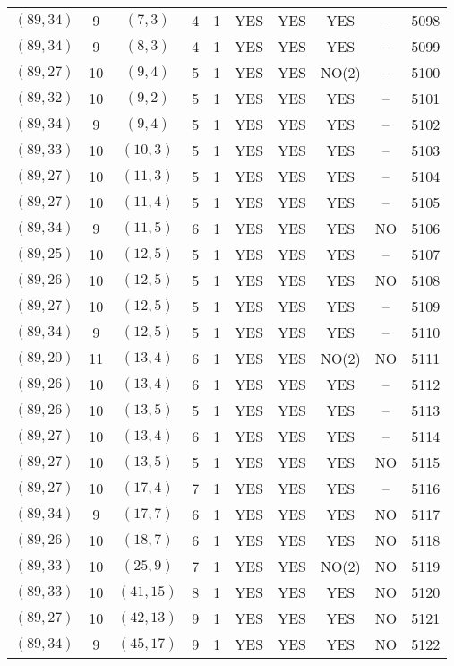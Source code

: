 \begin{longtable}{|c|c|c|c|c|c|c|c|c|c|}
$(89, 34)$ & 9 & $(7, 3)$ & 4 & 1 & YES & YES & YES & -- & 5098\\
$(89, 34)$ & 9 & $(8, 3)$ & 4 & 1 & YES & YES & YES & -- & 5099\\
$(89, 27)$ & 10 & $(9, 4)$ & 5 & 1 & YES & YES & NO(2) & -- & 5100\\
$(89, 32)$ & 10 & $(9, 2)$ & 5 & 1 & YES & YES & YES & -- & 5101\\
$(89, 34)$ & 9 & $(9, 4)$ & 5 & 1 & YES & YES & YES & -- & 5102\\
$(89, 33)$ & 10 & $(10, 3)$ & 5 & 1 & YES & YES & YES & -- & 5103\\
$(89, 27)$ & 10 & $(11, 3)$ & 5 & 1 & YES & YES & YES & -- & 5104\\
$(89, 27)$ & 10 & $(11, 4)$ & 5 & 1 & YES & YES & YES & -- & 5105\\
$(89, 34)$ & 9 & $(11, 5)$ & 6 & 1 & YES & YES & YES & NO & 5106\\
$(89, 25)$ & 10 & $(12, 5)$ & 5 & 1 & YES & YES & YES & -- & 5107\\
$(89, 26)$ & 10 & $(12, 5)$ & 5 & 1 & YES & YES & YES & NO & 5108\\
$(89, 27)$ & 10 & $(12, 5)$ & 5 & 1 & YES & YES & YES & -- & 5109\\
$(89, 34)$ & 9 & $(12, 5)$ & 5 & 1 & YES & YES & YES & -- & 5110\\
$(89, 20)$ & 11 & $(13, 4)$ & 6 & 1 & YES & YES & NO(2) & NO & 5111\\
$(89, 26)$ & 10 & $(13, 4)$ & 6 & 1 & YES & YES & YES & -- & 5112\\
$(89, 26)$ & 10 & $(13, 5)$ & 5 & 1 & YES & YES & YES & -- & 5113\\
$(89, 27)$ & 10 & $(13, 4)$ & 6 & 1 & YES & YES & YES & -- & 5114\\
$(89, 27)$ & 10 & $(13, 5)$ & 5 & 1 & YES & YES & YES & NO & 5115\\
$(89, 27)$ & 10 & $(17, 4)$ & 7 & 1 & YES & YES & YES & -- & 5116\\
$(89, 34)$ & 9 & $(17, 7)$ & 6 & 1 & YES & YES & YES & NO & 5117\\
$(89, 26)$ & 10 & $(18, 7)$ & 6 & 1 & YES & YES & YES & NO & 5118\\
$(89, 33)$ & 10 & $(25, 9)$ & 7 & 1 & YES & YES & NO(2) & NO & 5119\\
$(89, 33)$ & 10 & $(41, 15)$ & 8 & 1 & YES & YES & YES & NO & 5120\\
$(89, 27)$ & 10 & $(42, 13)$ & 9 & 1 & YES & YES & YES & NO & 5121\\
$(89, 34)$ & 9 & $(45, 17)$ & 9 & 1 & YES & YES & YES & NO & 5122\\

\end{longtable}
